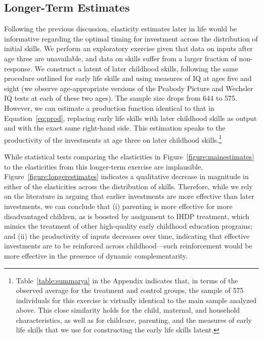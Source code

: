 \subsection{ Longer-Term Estimates} \label{section:longer}

Following the previous discussion, elasticity estimates later in life would be informative regarding the optimal timing for investment across the distribution of initial skills. We perform an exploratory exercise given that data on inputs after age three are unavailable, and data on skills suffer from a larger fraction of non-response. We construct a latent of later childhood skills, following the same procedure outlined for early life skills and using measures of IQ at ages five and eight (we observe age-appropriate versions of the Peabody Picture and Wechsler IQ tests at each of these two ages). The sample size drops from 644 to 575. However, we can estimate a production function identical to that in Equation~\eqref{eq:prod}, replacing early life skills with later childhood skills as output and with the exact same right-hand side. This estimation speaks to the productivity of the investments at age three on later childhood skills.\footnote{Table~\ref{table:summarya} in the Appendix indicates that, in terms of the observed average for the treatment and control groups, the sample of 575 individuals for this exercise is virtually identical to the main sample analyzed above. This close similarity holds for the child, maternal, and household characteristics, as well as for childcare, parenting, and the measures of early life skills that we use for constructing the early life skills latent.}

While statistical tests comparing the elasticities in Figure~\ref{figure:mainestimates} to the elasticities from this longer-term exercise are implausible, Figure~\ref{figure:longerestimates} indicates a qualitative decrease in magnitude in either of the elasticities across the distribution of skills. Therefore, while we rely on the literature in arguing that earlier investments are more effective than later investments, we can conclude that (i) parenting is more effective for more disadvantaged children, as is boosted by assignment to IHDP treatment, which mimics the treatment of other high-quality early childhood education programs; and (ii) the productivity of inputs decreases over time, indicating that effective investments are to be reinforced across childhood---such reinforcement would be more effective in the presence of dynamic complementarity. 

